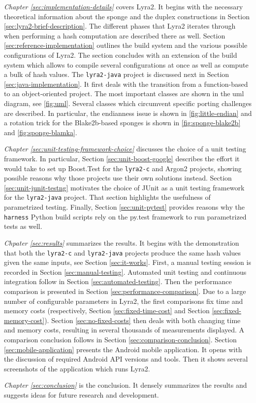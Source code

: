 \emph{Chapter \ref{sec:implementation-details}} covers Lyra2. It begins with the necessary theoretical information about the sponge and the duplex constructions in Section \ref{sec:lyra2-brief-description}. The different phases that Lyra2 iterates through when performing a hash computation are described there as well. Section \ref{sec:reference-implementation} outlines the build system and the various possible configurations of Lyra2. The section concludes with an extension of the build system which allows to compile several configurations at once as well as compute a bulk of hash values. The \texttt{lyra2-java} project is discussed next in Section \ref{sec:java-implementation}. It first deals with the transition from a function-based to an object-oriented project. The most important classes are shown in the \gls{uml} diagram, see \autoref{fig:uml}. Several classes which circumvent specific porting challenges are described. In particular, the endianness issue is shown in \autoref{fig:little-endian} and a rotation trick for the Blake2b-based sponges is shown in \autoref{fig:sponge-blake2b} and \autoref{fig:sponge-blamka}.

\emph{Chapter \ref{sec:unit-testing-framework-choice}} discusses the choice of a unit testing framework. In particular, Section \ref{sec:unit-boost-google} describes the effort it would take to set up Boost.Test for the \texttt{lyra2-c} and Argon2 projects, showing possible reasons why those projects use their own solutions instead. Section \ref{sec:unit-junit-testng} motivates the choice of JUnit as a unit testing framework for the \texttt{lyra2-java} project. That section highlights the usefulness of parametrized testing. Finally, Section \ref{sec:unit-pytest} provides reasons why the \texttt{harness} Python build scripts rely on the py.test framework to run parametrized tests as well.

\emph{Chpater \ref{sec:results}} summarizes the results. It begins with the demonstration that both the \texttt{lyra2-c} and \texttt{lyra2-java} projects produce the same hash values given the same inputs, see Section \ref{sec:it-works}. First, a manual testing session is recorded in Section \ref{sec:manual-testing}. Automated unit testing and continuous integration follow in Section \ref{sec:automated-testing}. Then the performance comparison is presented in Section \ref{sec:performance-comparison}. Due to a large number of configurable parameters in Lyra2, the first comparisons fix time and memory costs (respectively, Section \ref{sec:fixed-time-cost} and Section \ref{sec:fixed-memory-cost}). Section \ref{sec:no-fixed-costs} then deals with both changing time and memory costs, resulting in several thousands of measurements displayed. A comparison conclusion follows in Section \ref{sec:comparison-conclusion}. Section \ref{sec:mobile-application} presents the Android mobile application. It opens with the discussion of required Android API versions and tools. Then it shows several screenshots of the application which runs Lyra2.

\emph{Chapter \ref{sec:conclusion}} is the conclusion. It densely summarizes the results and suggests ideas for future research and development.
